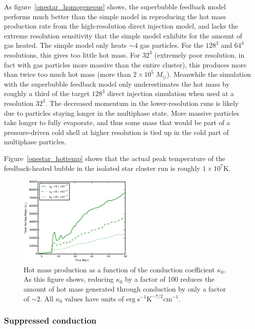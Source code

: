 As figure~\ref{onestar_homogeneous} shows, the superbubble feedback model
performs much better than the simple model in reproducing the hot mass
production rate from the high-resolution direct injection model, and lacks the
extreme resolution sensitivity that the simple model exhibits for the amount of
gas heated. The simple model only heats $\sim 4$ gas particles.  For the $128^3$
and $64^3$ resolutions, this gives too little hot mass.  For $32^3$ (extremely
poor resolution, in fact with gas particles more massive than the entire
cluster), this produces more than twice too much hot mass (more than
$2\times10^5\;M_\odot$). Meanwhile the simulation with the superbubble feedback
model only underestimates the hot mass by roughly a third of the target $128^3$
direct injection simulation when used at a resolution $32^3$.  The decreased
momentum in the lower-resolution runs is likely due to particles staying longer
in the multiphase state.  More massive particles take longer to fully evaporate,
and thus some mass that would be part of a pressure-driven cold shell at higher
resolution is tied up in the cold part of multiphase particles.

Figure~\ref{onestar_hottemp}  shows that the actual peak temperature of the
feedback-heated bubble in the isolated star cluster run is roughly
$1\times10^7\mathrm{K}$.


\begin{figure}
    \includegraphics[width=0.5\textwidth]{figures1/onestar_kappa.eps}
    \caption[Dependence of superbubble heated gas on conduction coefficient]{Hot
    mass production as a function of the conduction coefficient $\kappa_0$.  As
    this figure shows, reducing $\kappa_0$ by a factor of 100 reduces the amount
    of hot mass generated through conduction by only a factor of $\sim2$. All
    $\kappa_0$ values have units of $\mathrm{erg\; s^{-1} K^{-7/2} cm^{-1}}$.}
    \label{onestar_kappa}
\end{figure}

\subsubsection{Suppressed conduction}

